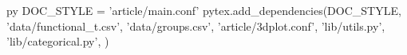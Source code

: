 \makeatletter
	\let\@afterindenttrue\@afterindentfalse
	\@afterindentfalse
\makeatother

\usepackage[explicit]{titlesec}
%
\titlespacing{\section}{0em}{1.5em}{0.4em}
%
\titlespacing{\subsection}{0em}{1em}{0.2em}
%
\titlespacing{\subsubsection}{0em}{0.75em}{0em}

\usepackage[autoprint=false, gobble=auto, pyfuture=all]{pythontex} %
\usepackage{pgf} %


\begin{pythontexcustomcode}[begin]{py}
DOC_STYLE = 'article/main.conf'
pytex.add_dependencies(DOC_STYLE,
	'data/functional_t.csv',
	'data/groups.csv',
	'article/3dplot.conf',
	'lib/utils.py',
	'lib/categorical.py',
	)
\end{pythontexcustomcode}


\setlength{\columnsep}{7mm}

\newcommand{\niceus}{\texttt{\_}}

%
